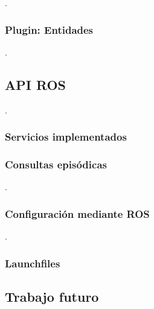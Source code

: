 .
\subsubsection{Plugin: Entidades}

.

\subsection{API ROS}

.

\subsubsection{Servicios implementados}



\subsubsection{Consultas episódicas}

.

\subsubsection{Configuración mediante ROS}

.
\lstset{style=/Style/yaml/ROS}


\subsubsection{Launchfiles}



\subsection{Trabajo futuro}

